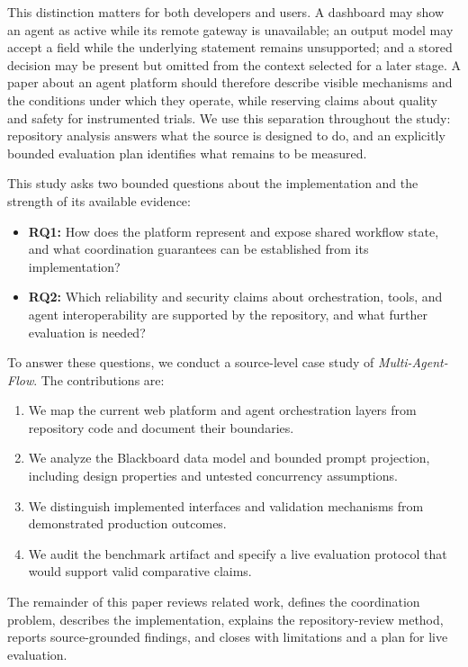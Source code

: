 \documentclass[12pt,onecolumn,draftclsnofoot]{IEEEtran}
\begin{document}
This distinction matters for both developers and users. A dashboard may show an agent as active while its remote gateway is unavailable; an output model may accept a field while the underlying statement remains unsupported; and a stored decision may be present but omitted from the context selected for a later stage. A paper about an agent platform should therefore describe visible mechanisms and the conditions under which they operate, while reserving claims about quality and safety for instrumented trials. We use this separation throughout the study: repository analysis answers what the source is designed to do, and an explicitly bounded evaluation plan identifies what remains to be measured.

This study asks two bounded questions about the implementation and the strength of its available evidence:
\begin{itemize}
    \item \textbf{RQ1:} How does the platform represent and expose shared workflow state, and what coordination guarantees can be established from its implementation?
    \item \textbf{RQ2:} Which reliability and security claims about orchestration, tools, and agent interoperability are supported by the repository, and what further evaluation is needed?
\end{itemize}

To answer these questions, we conduct a source-level case study of \textit{Multi-Agent-Flow}. The contributions are:
\begin{enumerate}
    \item We map the current web platform and agent orchestration layers from repository code and document their boundaries.
    \item We analyze the Blackboard data model and bounded prompt projection, including design properties and untested concurrency assumptions.
    \item We distinguish implemented interfaces and validation mechanisms from demonstrated production outcomes.
    \item We audit the benchmark artifact and specify a live evaluation protocol that would support valid comparative claims.
\end{enumerate}

The remainder of this paper reviews related work, defines the coordination problem, describes the implementation, explains the repository-review method, reports source-grounded findings, and closes with limitations and a plan for live evaluation.
\end{document}
